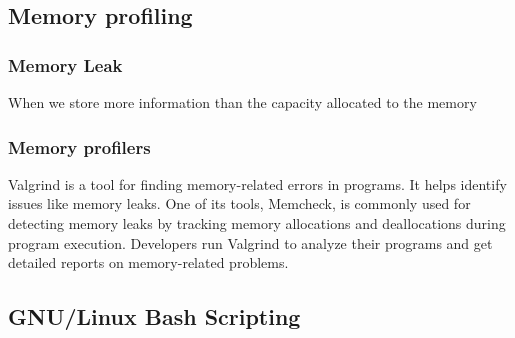 \documentclass[titlepage]{article}
\begin{document}
\subsection{Memory profiling}

\subsubsection{Memory Leak}
When we store more information than the capacity allocated to the memory
\subsubsection{Memory profilers}
Valgrind is a tool for finding memory-related errors in programs. It helps identify issues like memory leaks. One of its tools, Memcheck, is commonly used for detecting memory leaks by tracking memory allocations and deallocations during program execution. Developers run Valgrind to analyze their programs and get detailed reports on memory-related problems.
\subsection{GNU/Linux Bash Scripting}
\end{document}
